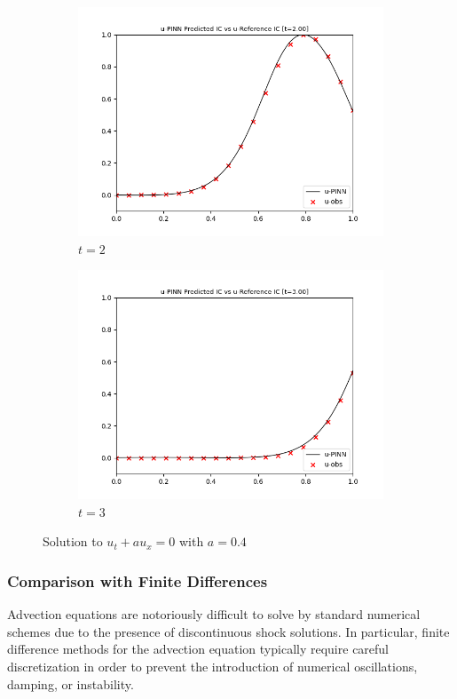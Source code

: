\documentclass[letterpaper,11pt]{article}
\begin{document}
\begin{figure}[h]
\begin{subfigure}{0.45\textwidth}
            \includegraphics*[width=\textwidth]{advection_forward_t2.00.png}
            \caption{$t = 2$}
        \end{subfigure}
        \hfill
        \begin{subfigure}{0.45\textwidth}
            \includegraphics*[width=\textwidth]{advection_forward_t3.00.png}
            \caption{$t = 3$}
        \end{subfigure}
        \caption{Solution to $u_t + a u_x = 0$ with $a = 0.4$}
    \end{figure}

    \subsubsection*{Comparison with Finite Differences}
    Advection equations are notoriously difficult to solve by standard numerical schemes due to the presence of
    discontinuous shock solutions. In particular, finite difference methods for the advection equation typically require
    careful discretization in order to prevent the introduction of numerical oscillations, damping, or instability.
    
\end{document}
